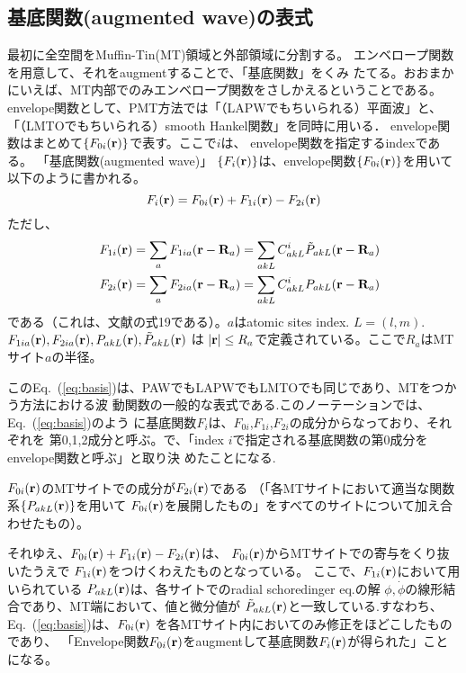 \documentclass[a4paper,10pt,aip,onecolumn,amsmath,amssymb,floatfix,rmp]{revtex4-1}
\newcommand{\bfr}{{\bf r}}
\newcommand{\bfR}{{\bf R}}
\def\phidot{\dot{\phi}}
\newcommand{\req}[1]{\mbox{Eq.~\!(\ref{#1})}}
\begin{document}
\subsection{基底関数(augmented wave)の表式} 
最初に全空間をMuffin-Tin(MT)領域と外部領域に分割する。
エンベロープ関数を用意して、それをaugmentすることで、「基底関数」をくみ
たてる。おおまかにいえば、MT内部でのみエンベロープ関数をさしかえるということである。
envelope関数として、PMT方法では「（LAPWでもちいられる）平面波」と、
「（LMTOでもちいられる）smooth Hankel関数」を同時に用いる．
envelope関数はまとめて$\{{F}_{0i}(\bfr)\}$で表す。ここで$i$は、
envelope関数を指定するindexである。
「基底関数(augmented wave)」 $\{{F}_i(\bfr)\}$は、envelope関数$\{F_{0i}(\bfr)\}$を用いて以下のように書かれる。
\begin{equation}
F_i(\bfr) = F_{0i}(\bfr) + F_{1i}(\bfr)-F_{2i}(\bfr) \label{eq:basis} \\
\end{equation}
ただし、
\begin{eqnarray}
&&F_{1i}(\bfr)=\sum_a F_{1ia}(\bfr-\bfR_a)= \sum_{akL} C^{i}_{akL} \tilde{P}_{akL}(\bfr-\bfR_a) \\ 
&&F_{2i}(\bfr)=\sum_a F_{2ia}(\bfr-\bfR_a)= \sum_{akL} C^{i}_{akL} {P}_{akL}(\bfr-\bfR_a)  
\end{eqnarray}
である（これは、文献\cite{lmfchap}の式19である）。$a$はatomic sites
index. $L=(l,m)$.$F_{1ia}(\bfr),F_{2ia}(\bfr),P_{akL} (\bfr),\tilde{P}_{akL} (\bfr)$ は 
$|\bfr| \le R_a$で定義されている。ここで$R_a$はMTサイト$a$の半径。
 
この\req{eq:basis}は、PAWでもLAPWでもLMTOでも同じであり、MTをつかう方法における波
動関数の一般的な表式である.このノーテーションでは、\req{eq:basis}のよう
に基底関数$F_i$は、$F_{0i}$,$F_{1i}$,$F_{2i}$の成分からなっており、それぞれを
第0,1,2成分と呼ぶ。で、「index $i$で指定される基底関数の第0成分をenvelope関数と呼ぶ」と取り決
めたことになる.

$F_{0i}(\bfr)$のMTサイトでの成分が$F_{2i}(\bfr)$である
（「各MTサイトにおいて適当な関数系$\{{P}_{akL}(\bfr)\}$を用いて
$F_{0i}(\bfr)$を展開したもの」をすべてのサイトについて加え合わせたもの）。

それゆえ、$F_{0i}(\bfr)+F_{1i}(\bfr)-F_{2i}(\bfr)$は、
$F_{0i}(\bfr)$からMTサイトでの寄与をくり抜いたうえで
$F_{1i}(\bfr)$をつけくわえたものとなっている。
ここで、$F_{1i}(\bfr)$において用いられている
${P}_{akL}(\bfr)$は、各サイトでのradial schoredinger eq.の解
$\phi,\phidot$の線形結合であり、MT端において、値と微分値が
$\tilde{P}_{akL}(\bfr)$と一致している.すなわち、
\req{eq:basis}は、$F_{0i}(\bfr)$
を各MTサイト内においてのみ修正をほどこしたものであり、
「Envelope関数$F_{0i}(\bfr)$をaugmentして基底関数$F_i(\bfr)$が得られた」ことになる。
\end{document}
